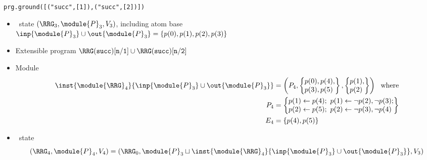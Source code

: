 \begin{frame}{\texttt{prg.ground([("succ",[1]),("succ",[2])])}}
  \begin{itemize}
  \item {} \clingo\ state $(\boldsymbol{\RRG}_3,\module{P}_3,V_3 )$, including atom base
    \\\qquad\quad
    \(
    \inp{\module{P}_3}\cup\out{\module{P}_3}=\{p(0),p(1),p(2),p(3)\}
    \)
  \item {} Extensible program
    \(
    \RRG(\mathtt{succ})[\mathtt{n}/\mathtt{1}]\cup\RRG(\mathtt{succ})[\mathtt{n}/\mathtt{2}]
    \)
  \item<2->  Module
    \begin{align*}
      \inst{\module{\RRG}_4}{\inp{\module{P}_3}\cup\out{\module{P}_3}}
      &=
        \left(
        P_4
        ,
        \left\{
        \begin{array}{@{}l@{}}
          p(0),p(4),
          \\
          p(3),p(5)
        \end{array}
      \right\}
      ,
      \left\{
      \begin{array}{@{}l@{}}
        p(1),\\p(2)
      \end{array}
      \right\}
      \right)
      \ \text{ where}\\
      P_4 & {} =
               \left\{
               \begin{array}{@{}l@{}}
                 p(1)\leftarrow p(4);\ p(1)\leftarrow \neg p(2),\neg p(3);
                 \\
                 p(2)\leftarrow p(5);\ p(2)\leftarrow \neg p(3),\neg p(4)
               \end{array}
      \right\}\\
      E_4 & {} = \{p(4),p(5)\}
    \end{align*}
  \item<2->  \clingo\ state
    \[
    (\boldsymbol{\RRG}_4,\module{P}_4,V_4 )
    =
    (\boldsymbol{\RRG}_0,\module{P}_3\sqcup\inst{\module{\RRG}_4}{\inp{\module{P}_3}\cup\out{\module{P}_3}},V_3)
    \]
  \end{itemize}
\end{frame}
